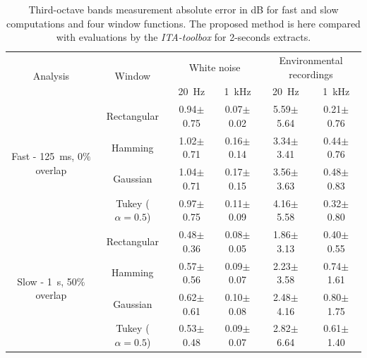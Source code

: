 \documentclass[final,3p,times,twocolumn]{elsarticle}
\begin{document}
\begin{table}[h]
\centering
\caption{Third-octave bands measurement absolute error in dB for fast and slow computations and four window functions. The proposed method is here compared with evaluations by the \textit{ITA-toolbox} for 2-seconds extracts. }
\label{T1}
\begin{tabular}{|c|c|c|c|c|c|}
\cline{1-6}
\multirow{2}{*}{Analysis} & \multirow{2}{*}{Window} & \multicolumn{2}{|c|}{White noise} & \multicolumn{2}{|c|}{Environmental recordings}\\ \cline{3-6}
 & & 20~Hz & 1~kHz & 20~Hz & 1~kHz\\ \cline{1-6}
\multicolumn{1}{|c}{\multirow{4}{*}{Fast - 125~ms, 0$\%$ overlap}}
 & \multicolumn{1}{|c|}{Rectangular} & 0.94$\pm$0.75 & 0.07$\pm$0.02 & 5.59$\pm$5.64 & 0.21$\pm$0.76\\ \cline{2-6}
\multicolumn{1}{|c}{}
 & \multicolumn{1}{|c|}{Hamming} & 1.02$\pm$0.71\newline & 0.16$\pm$0.14 & 3.34$\pm$3.41 & 0.44$\pm$0.76\\ \cline{2-6}
\multicolumn{1}{|c}{}
 & \multicolumn{1}{|c|}{Gaussian} & 1.04$\pm$0.71 & 0.17$\pm$0.15 & 3.56$\pm$3.63 & 0.48$\pm$0.83\\ \cline{2-6}
\multicolumn{1}{|c}{}
 & \multicolumn{1}{|c|}{Tukey ($\alpha = 0.5$)} & 0.97$\pm$0.75 & 0.11$\pm$0.09 & 4.16$\pm$5.58 & 0.32$\pm$0.80\\ \cline{1-6}
 \multicolumn{1}{|c}{\multirow{4}{*}{Slow - 1~s, 50$\%$ overlap}}
 & \multicolumn{1}{|c|}{Rectangular} & 0.48$\pm$0.36 & 0.08$\pm$0.05 & 1.86$\pm$3.13 & 0.40$\pm$0.55\\ \cline{2-6}
\multicolumn{1}{|c}{}
 & \multicolumn{1}{|c|}{Hamming} & 0.57$\pm$0.56 & 0.09$\pm$0.07 & 2.23$\pm$3.58 & 0.74$\pm$1.61\\ \cline{2-6}
\multicolumn{1}{|c}{}
 & \multicolumn{1}{|c|}{Gaussian} & 0.62$\pm$0.61 & 0.10$\pm$0.08 & 2.48$\pm$4.16 & 0.80$\pm$1.75\\ \cline{2-6}
\multicolumn{1}{|c}{}
 & \multicolumn{1}{|c|}{Tukey ($\alpha = 0.5$)} & 0.53$\pm$0.48 & 0.09$\pm$0.07 & 2.82$\pm$6.64 & 0.61$\pm$1.40\\ \cline{1-6}
\end{tabular}
\end{table}
\end{document}

